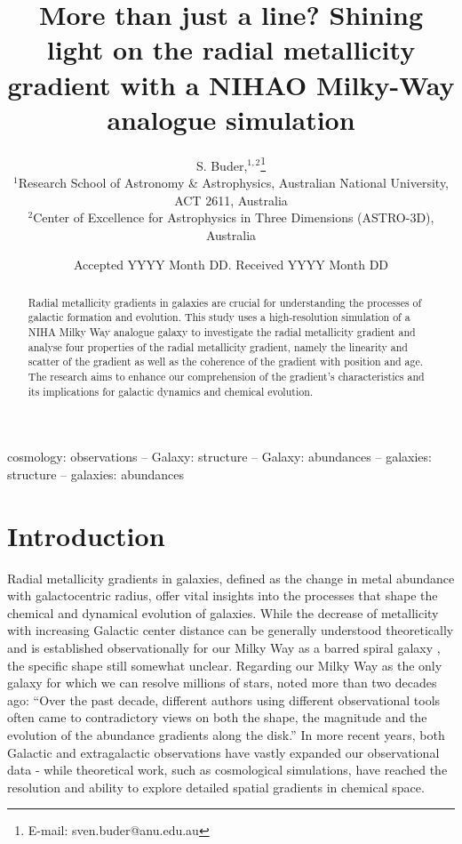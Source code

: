 \documentclass[fleqn,usenatbib]{mnras}
\title[NIHAO vs. Milky Way: Radial metallicity gradients]{More than just a line? Shining light on the radial metallicity gradient with a NIHAO Milky-Way analogue simulation}
\author[S. Buder]{
S. Buder,$^{1,2}$\thanks{E-mail: sven.buder@anu.edu.au}
\\
$^{1}$Research School of Astronomy \& Astrophysics, Australian National University, ACT 2611, Australia\\
$^{2}$Center of Excellence for Astrophysics in Three Dimensions (ASTRO-3D), Australia\\
}
\date{Accepted YYYY Month DD. Received YYYY Month DD}
\begin{document}
\label{firstpage}
\pagerange{\pageref{firstpage}--\pageref{lastpage}}
\maketitle

\begin{abstract} %
Radial metallicity gradients in galaxies are crucial for understanding the processes of galactic formation and evolution. This study uses a high-resolution simulation of a NIHA Milky Way analogue galaxy to investigate the radial metallicity gradient and analyse four properties of the radial metallicity gradient, namely the linearity and scatter of the gradient as well as the coherence of the gradient with position and age. The research aims to enhance our comprehension of the gradient's characteristics and its implications for galactic dynamics and chemical evolution.
\end{abstract}
\begin{keywords}
cosmology: observations -- Galaxy: structure -- Galaxy: abundances  -- galaxies: structure -- galaxies: abundances
\end{keywords}



\section{Introduction}
\label{sec:intro}

Radial metallicity gradients in galaxies, defined as the change in metal abundance with galactocentric radius, offer vital insights into the processes that shape the chemical and dynamical evolution of galaxies. While the decrease of metallicity with increasing Galactic center distance can be generally understood theoretically \citep{Larson1976, Tinsley1980, Chiosi1980} and is established observationally for our Milky Way as a barred spiral galaxy \citep{Searle1971, Janes1979, Twarog1997}, the specific shape still somewhat unclear. Regarding our Milky Way as the only galaxy for which we can resolve millions of stars, \citet{Chiappini2002} noted more than two decades ago: ``Over the past decade, different authors using different observational tools often came to contradictory views on both the shape, the magnitude and the evolution of the abundance gradients along the disk.'' In more recent years, both Galactic and extragalactic observations have vastly expanded our observational data - while theoretical work, such as cosmological simulations, have reached the resolution and ability to explore detailed spatial gradients in chemical space.
\end{document}
